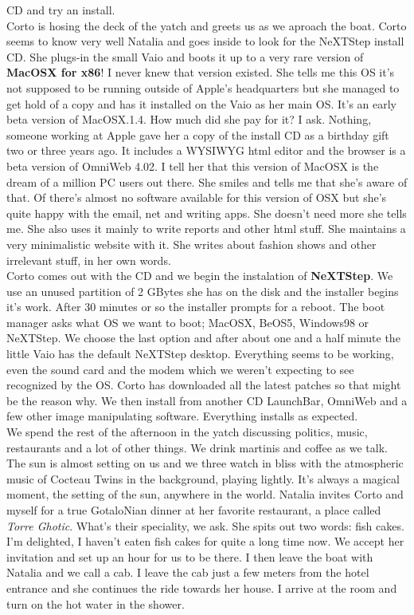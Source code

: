 \documentclass[11pt,twoside,a4paper]{book}
\begin{document}
\begin{multicols*}{2}
CD and try an install. ~\\

    Corto is hosing the deck of the yatch and greets us as we aproach the boat. Corto seems to know very well Natalia and goes inside to look for the NeXTStep install CD. She plugs-in the small Vaio and boots it up to a very rare version of \textbf{MacOSX for x86}! I never knew that version existed. She tells me this OS it's not supposed to be running outside of Apple's headquarters but she managed to get hold of a copy and has it installed on the Vaio as her main OS. It's an early beta version of MacOSX.1.4. How much did she pay for it? I ask. Nothing, someone working at Apple gave her a copy of the install CD as a birthday gift two or three years ago. It includes a WYSIWYG html editor and the browser is a beta version of OmniWeb 4.02. I tell her that this version of MacOSX is the dream of a million PC users out there. She smiles and tells me that she's aware of that. Of there's almost no software available for this version of OSX but she's quite happy with the email, net and writing apps. She doesn't need more she tells me. She also uses it mainly to write reports and other html stuff. She maintains a very minimalistic website with it. She writes about fashion shows and other irrelevant stuff, in her own words. ~\\

    Corto comes out with the CD and we begin the instalation of \textbf{NeXTStep}. We use an unused partition of 2 GBytes she has on the disk and the installer begins it's work. After 30 minutes or so the installer prompts for a reboot. The boot manager asks what OS we want to boot; MacOSX, BeOS5, Windows98 or NeXTStep. We choose the last option and after about one and a half minute the little Vaio has the default NeXTStep desktop. Everything seems to be working, even the sound card and the modem which we weren't expecting to see recognized by the OS. Corto has downloaded all the latest patches so that might be the reason why. We then install from another CD LaunchBar, OmniWeb and a few other image manipulating software. Everything installs as expected. ~\\

    We spend the rest of the afternoon in the yatch discussing politics, music, restaurants and a lot of other things. We drink martinis and coffee as we talk. The sun is almost setting on us and we three watch in bliss with the atmospheric music of Cocteau Twins in the background, playing lightly. It's always a magical moment, the setting of the sun, anywhere in the world. Natalia invites Corto and myself for a true GotaloNian dinner at her favorite restaurant, a place called \emph{Torre Ghotic}. What's their speciality, we ask. She spits out two words: fish cakes. I'm delighted, I haven't eaten fish cakes for quite a long time now. We accept her invitation and set up an hour for us to be there. I then leave the boat with Natalia and we call a cab. I leave the cab just a few meters from the hotel entrance and she continues the ride towards her house. I arrive at the room and turn on the hot water in the shower. ~\\


\end{multicols*}
\end{document}
